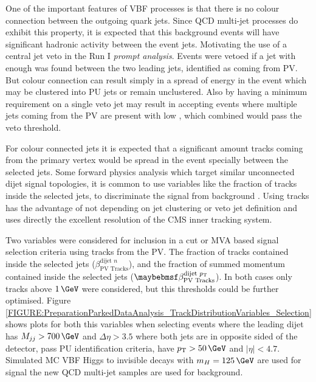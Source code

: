 %
%


One of the important features of \gls{VBF} processes is that there is no colour connection between the outgoing quark jets. Since \gls{QCD} multi-jet processes do exhibit this property, it is expected that this background events will have significant hadronic activity between the event jets. Motivating the use of a central jet veto in the Run I \textit{prompt analysis}. Events were vetoed if a jet with enough \pt was found between the two leading jets, identified as coming from \gls{PV}. But colour connection can result simply in a spread of energy in the event which may be clustered into \gls{PU} jets or remain unclustered. Also by having a minimum \pt requirement on a single veto jet may result in accepting events where multiple jets coming from the \gls{PV} are present with low \pt, which combined would pass the veto threshold.

For colour connected jets it is expected that a significant amount tracks coming from the primary vertex would be spread in the event specially between the selected jets. Some forward physics analysis which target similar unconnected dijet signal topologies, it is common to use variables like the fraction of tracks inside the selected jets, to discriminate the signal from background \cite{ARTICLE:AnalysisDiffractiveJets}. Using tracks has the advantage of not depending on jet clustering or veto jet definition and uses directly the excellent resolution of the \gls{CMS} inner tracking system. 

Two variables were considered for inclusion in a cut or \gls{MVA} based signal selection criteria using tracks from the \gls{PV}. The fraction of tracks contained inside the selected jets ($\beta_{\text{PV Tracks}}^{\text{dijet }n}$), and the fraction of summed momentum contained inside the selected jets ($\beta_{\text{PV Tracks}}^{\text{dijet }\pt}$). In both cases only tracks above $1\,\GeV$ were considered, but this thresholds could be further optimised. Figure \ref{FIGURE:PreparationParkedDataAnalysis_TrackDistributionVariables_Selection} shows plots for both this variables when selecting events where the leading dijet has $M_{jj}>700\,\GeV$ and $\Delta\eta>3.5$ where both jets are in opposite sided of the detector, pass \gls{PU} identification criteria, have $\pt>50\,\GeV$ and $|\eta|<4.7$. Simulated \gls{MC} \gls{VBF} Higgs to invisible decays with $m_H=125\,\GeV$ are used for signal the new \gls{QCD} multi-jet samples are used for background.

